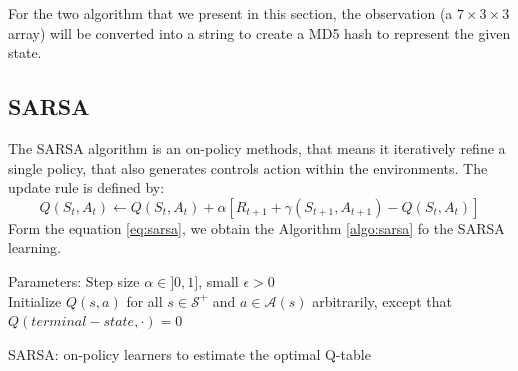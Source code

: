For the two algorithm that we present in this section, the observation (a $7\times3\times3$ array) will be converted into a string to create a MD5 hash to represent the given state.
\subsection{SARSA}
The SARSA algorithm is an on-policy methods, that means it iteratively refine a single policy, that also generates controls action within the environments. The update rule is defined by:
\begin{equation}\label{eq:sarsa}
	Q(S_t, A_t)\leftarrow Q(S_t, A_t) + \alpha[R_{t+1} + \gamma(S_{t+1}, A_{t+1}) - Q(S_t, A_t)]
\end{equation}
Form the equation \eqref{eq:sarsa}, we obtain the Algorithm \ref{algo:sarsa} fo the SARSA learning.
\begin{algorithm}
	Parameters: Step size $\alpha\in]0,1]$, small $\epsilon>0$\\
	Initialize $Q(s,a)$ for all $s\in\mathcal{S}^{+}$ and $a\in\mathcal{A}(s)$ arbitrarily, except that $Q(terminal-state, \cdot)=0$\\
\caption{SARSA: on-policy learners to estimate the optimal Q-table}
\label{algo:sarsa}
\end{algorithm}

